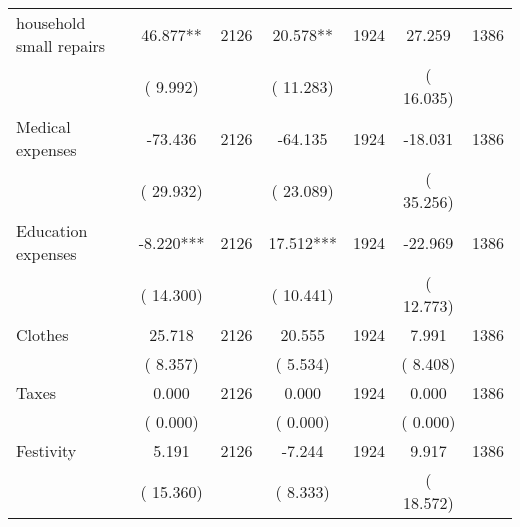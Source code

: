 \begin{tabular}{l*{6}{c}}
household small repairs        &             46.877**      &       2126       &             20.578**      &       1924       &             27.259      &       1386       \\
                       &       (       9.992)            &                               &       (      11.283)            &                               &       (      16.035)            &                               \\
Medical expenses        &            -73.436      &       2126       &            -64.135      &       1924       &            -18.031      &       1386       \\
                       &       (      29.932)            &                               &       (      23.089)            &                               &       (      35.256)            &                               \\
Education expenses        &             -8.220***      &       2126       &             17.512***      &       1924       &            -22.969      &       1386       \\
                       &       (      14.300)            &                               &       (      10.441)            &                               &       (      12.773)            &                               \\
Clothes        &             25.718      &       2126       &             20.555      &       1924       &              7.991      &       1386       \\
                       &       (       8.357)            &                               &       (       5.534)            &                               &       (       8.408)            &                               \\
Taxes        &              0.000      &       2126       &              0.000      &       1924       &              0.000      &       1386       \\
                       &       (       0.000)            &                               &       (       0.000)            &                               &       (       0.000)            &                               \\
Festivity        &              5.191      &       2126       &             -7.244      &       1924       &              9.917      &       1386       \\
                       &       (      15.360)            &                               &       (       8.333)            &                               &       (      18.572)            &                               \\
\hline \end{tabular}